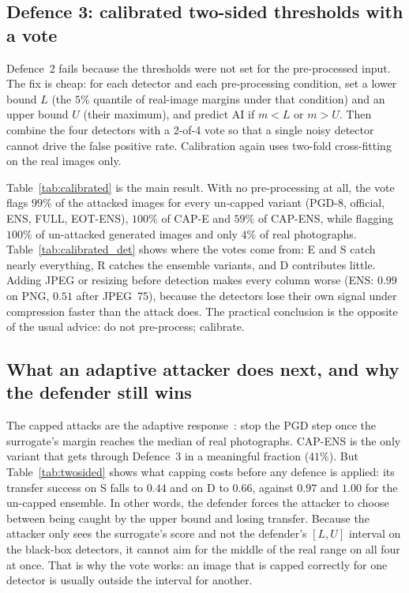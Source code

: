 \documentclass[journal]{IEEEtran}
\begin{document}
\subsection{Defence 3: calibrated two-sided thresholds with a vote}
\label{sec:defence-3}

Defence~2 fails because the thresholds were not set for the pre-processed input. The fix is cheap: for each detector and each pre-processing condition, set a lower bound $L$ (the $5\%$ quantile of real-image margins under that condition) and an upper bound $U$ (their maximum), and predict AI if $m<L$ or $m>U$. Then combine the four detectors with a 2-of-4 vote so that a single noisy detector cannot drive the false positive rate. Calibration again uses two-fold cross-fitting on the real images only.

Table~\ref{tab:calibrated} is the main result. With no pre-processing at all, the vote flags $99\%$ of the attacked images for every un-capped variant (PGD-8, official, ENS, FULL, EOT-ENS), $100\%$ of CAP-E and $59\%$ of CAP-ENS, while flagging $100\%$ of un-attacked generated images and only $4\%$ of real photographs. Table~\ref{tab:calibrated_det} shows where the votes come from: E and S catch nearly everything, R catches the ensemble variants, and D contributes little. Adding JPEG or resizing before detection makes every column worse (ENS: $0.99$ on PNG, $0.51$ after JPEG~75), because the detectors lose their own signal under compression faster than the attack does. The practical conclusion is the opposite of the usual advice: do not pre-process; calibrate.

\subsection{What an adaptive attacker does next, and why the defender still wins}
\label{sec:defence-adaptive}

The capped attacks are the adaptive response~\cite{carlini2017bypassing}: stop the PGD step once the surrogate's margin reaches the median of real photographs. CAP-ENS is the only variant that gets through Defence~3 in a meaningful fraction ($41\%$). But Table~\ref{tab:twosided} shows what capping costs before any defence is applied: its transfer success on S falls to $0.44$ and on D to $0.66$, against $0.97$ and $1.00$ for the un-capped ensemble. In other words, the defender forces the attacker to choose between being caught by the upper bound and losing transfer. Because the attacker only sees the surrogate's score and not the defender's $[L,U]$ interval on the black-box detectors, it cannot aim for the middle of the real range on all four at once. That is why the vote works: an image that is capped correctly for one detector is usually outside the interval for another.
\end{document}
